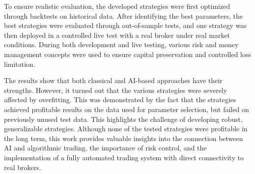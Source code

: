 To ensure realistic evaluation, the developed strategies were first optimized through backtests on historical data.
After identifying the best parameters, the best strategies were evaluated through out-of-sample tests, and one strategy was then deployed in a controlled live test with a real broker under real market conditions.
During both development and live testing, various risk and money management concepts were used to ensure capital preservation and controlled loss limitation.

The results show that both classical and AI-based approaches have their strengths.
However, it turned out that the various strategies were severely affected by overfitting.
This was demonstrated by the fact that the strategies achieved profitable results on the data used for parameter selection, but failed on previously unused test data.
This highlights the challenge of developing robust, generalizable strategies.
Although none of the tested strategies were profitable in the long term, this work provides valuable insights into the connection between AI and algorithmic trading, the importance of risk control, and the implementation of a fully automated trading system with direct connectivity to real brokers.